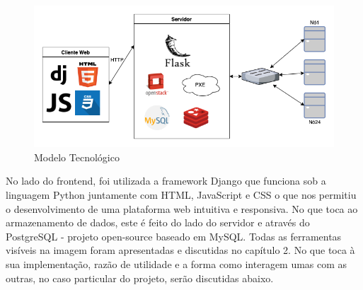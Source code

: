 \begin{figure}[!ht]
    \centering
    \includegraphics[height=0.3\textheight]{images/tecnologias.png}
    \caption{Modelo Tecnológico}
    \label{fig:tecno}
\end{figure}
No lado do frontend, foi utilizada a framework Django que funciona sob a linguagem Python juntamente com HTML, JavaScript e CSS o que nos permitiu o desenvolvimento de uma plataforma web intuitiva e responsiva. \newline
No que toca ao armazenamento de dados, este é feito do lado do servidor e através do PostgreSQL - projeto open-source baseado em MySQL. \newline
Todas as ferramentas visíveis na imagem foram apresentadas e discutidas no capítulo 2. No que toca à sua implementação, razão de utilidade e a forma como interagem umas com as outras, no caso particular do projeto, serão discutidas abaixo.
